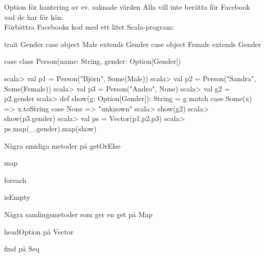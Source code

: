 \begin{Slide}{Option för hantering av ev. saknade värden}\SlideFontSmall
Alla vill inte berätta för Facebook vad de har för kön. \\ Förbättra Facebooks kod med ett litet Scala-program:
\begin{Code}
trait Gender
case object Male   extends Gender
case object Female extends Gender

case class Person(name: String, gender: Option[Gender])
\end{Code}
\begin{REPL}
scala> val p1 = Person("Björn",  Some(Male))
scala> val p2 = Person("Sandra", Some(Female))
scala> val p3 = Person("Andro",  None)
scala> val g2 = p2.gender
scala> def show(g: Option[Gender]): String = g match {
         case Some(x) => x.toString
         case None    => "unknown"
       }
scala> show(g2)
scala> show(p3.gender)
scala> val ps = Vector(p1,p2,p3)
scala> ps.map(_.gender).map(show)
\end{REPL}
\end{Slide}

\begin{Slide}{Några smidiga metoder på }
getOrElse

map

foreach

isEmpty
\end{Slide}


\begin{Slide}{Några samlingsmetoder som ger en }
get på Map

headOption på Vector

find på Seq
\end{Slide}



\fi


